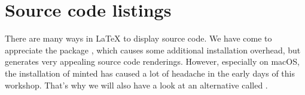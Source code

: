 \chapter{Source code listings}
\label{sec:source-code-listings}

There are many ways in \LaTeX{} to display source code.
We have come to appreciate the package , which causes some additional installation overhead, but generates very appealing source code renderings.
However, especially on macOS, the installation of minted has caused a lot of headache in the early days of this workshop.
That's why we will also have a look at an alternative called .



